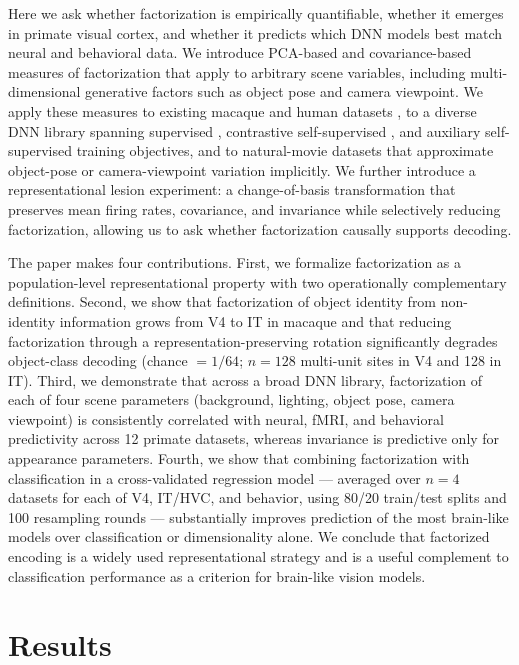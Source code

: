 \documentclass[11pt]{article}
\begin{document}
Here we ask whether factorization is empirically quantifiable, whether it
emerges in primate visual cortex, and whether it predicts which DNN models
best match neural and behavioral data. We introduce PCA-based and
covariance-based measures of factorization that apply to arbitrary scene
variables, including multi-dimensional generative factors such as object
pose and camera viewpoint. We apply these measures to existing macaque and
human datasets \citep{majaj2015simple, hong2016explicit, rajalingham2018large,
khalighrazavi2014deep}, to a diverse DNN library spanning supervised
\citep{krizhevsky2012imagenet, he2016deep}, contrastive self-supervised
\citep{chen2020simple, he2020momentum}, and auxiliary self-supervised
\citep{zhuang2021unsupervised} training objectives, and to natural-movie
datasets that approximate object-pose or camera-viewpoint variation
implicitly. We further introduce a representational lesion experiment: a
change-of-basis transformation that preserves mean firing rates, covariance,
and invariance while selectively reducing factorization, allowing us to ask
whether factorization causally supports decoding.

The paper makes four contributions. First, we formalize factorization as a
population-level representational property with two operationally
complementary definitions. Second, we show that factorization of object
identity from non-identity information grows from V4 to IT in macaque and
that reducing factorization through a representation-preserving rotation
significantly degrades object-class decoding (chance \(=1/64\); \(n=128\)
multi-unit sites in V4 and 128 in IT). Third, we demonstrate that across a
broad DNN library, factorization of each of four scene parameters
(background, lighting, object pose, camera viewpoint) is consistently
correlated with neural, fMRI, and behavioral predictivity across 12 primate
datasets, whereas invariance is predictive only for appearance parameters.
Fourth, we show that combining factorization with classification in a
cross-validated regression model --- averaged over \(n=4\) datasets for each
of V4, IT/HVC, and behavior, using 80/20 train/test splits and 100
resampling rounds --- substantially improves prediction of the most
brain-like models over classification or dimensionality alone. We conclude
that factorized encoding is a widely used representational strategy and is a
useful complement to classification performance as a criterion for
brain-like vision models.

\section{Results}
\end{document}
